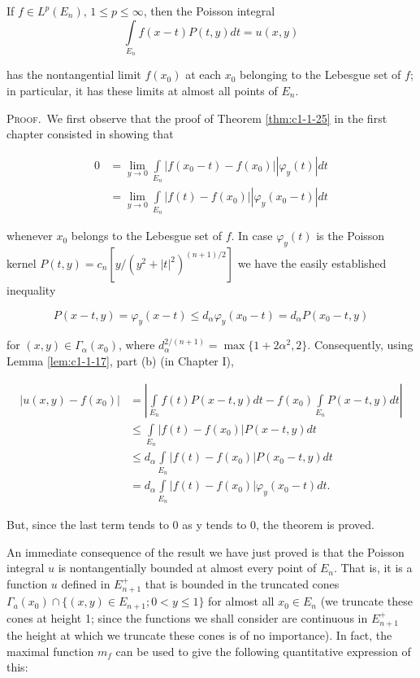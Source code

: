 \begin{theorem}
\label{thm:c2-3-16}
If $f \in L^p(E_n)$, $1 \leq p \leq \infty$, then the Poisson integral
\[
\int\limits_{E_{n}}f(x-t)P(t,y)dt=u(x,y)
\]

has the nontangential limit $f(x_0)$ at each $x_0$ belonging to the Lebesgue set of $f$; in particular, it has these limits at almost all points of $E_n$.
\end{theorem}

\textsc{Proof.}\ We first observe that the proof of Theorem \ref{thm:c1-1-25} in the first chapter consisted in showing that

\[
\begin{aligned}0&=\lim_{y\to0}\int\limits_{E_{n}}\left|f(x_{0}-t)-f(x_{0})\right|\left|\varphi_{y}(t)\right|dt\\&=\lim_{y\to0}\int\limits_{E_{n}}\left|f(t)-f(x_{0})\right|\left|\varphi_{y}(x_{0}-t)\right|dt\end{aligned}
\]

whenever $x_{0}$ belongs to the Lebesgue set of $f$. In case $\varphi_{y}(t)$ is the Poisson kernel $P(t,y)=c_{n}[y/(y^{2}+|t|^{2})^{(n+1)/2}]$ we have the easily established inequality

\begin{equation}\label{eq:c2-3-17}
P(x-t,y)=\varphi_{y}(x-t)\leq d_{\alpha}\varphi_{y}(x_{0}-t)=d_{\alpha}P(x_{0}-t,y)
\end{equation}

for $(x, y) \in \Gamma_\alpha(x_0)$, where $d_\alpha^{2/(n+1)} = \max\{1 + 2\alpha^2, 2\}$. Consequently, using Lemma \ref{lem:c1-1-17}, part (b) (in Chapter I),

\[
\begin{aligned}|u(x,y)-f(x_{0})|&=\left|\int\limits_{E_{n}}f(t)P(x-t,y)dt-f(x_{0})\int\limits_{E_{n}}P(x-t,y)dt\right|\\&\leq\int\limits_{E_{n}}|f(t)-f(x_{0})|P(x-t,y)dt\\&\leq d_{\alpha}\int\limits_{E_{n}}|f(t)-f(x_{0})|P(x_{0}-t,y)dt\\&=d_{\alpha}\int\limits_{E_{n}}|f(t)-f(x_{0})|\varphi_{y}(x_{0}-t)dt.\end{aligned}
\]

But, since the last term tends to 0 as y tends to 0, the theorem is proved.

An immediate consequence of the result we have just proved is that the Poisson integral $u$ is nontangentially bounded at almost every point of $E_n$. That is, it is a function $u$ defined in $E_{n+1}^+$ that is bounded in the truncated cones $\Gamma_a(x_0) \cap \{(x, y) \in E_{n+1}; 0 < y \leq 1\}$ for almost all $x_0 \in E_n$ (we truncate these cones at height 1; since the functions we shall consider are continuous in $E_{n+1}^+$ the height at which we truncate these cones is of no importance). In fact, the maximal function $m_f$ can be used to give the following quantitative expression of this:

